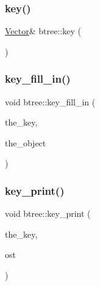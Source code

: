\mbox{\label{classbtree_abc561b2c60acc5a699637b7eb2549503}} 
\subsubsection{\texorpdfstring{key()}{key()}}
{\footnotesize\ttfamily \mbox{\hyperlink{class_vector}{Vector}}\& btree\+::key (\begin{DoxyParamCaption}{ }\end{DoxyParamCaption})\hspace{0.3cm}{\ttfamily [inline]}}

\mbox{\label{classbtree_ae75d5ef9677891b93960a55dffdc6eb2}} 
\subsubsection{\texorpdfstring{key\+\_\+fill\+\_\+in()}{key\_fill\_in()}}
{\footnotesize\ttfamily void btree\+::key\+\_\+fill\+\_\+in (\begin{DoxyParamCaption}\item[{\mbox{\hyperlink{galois_8h_ab6cc7b4aeb6ea31aba2b3fbfc83ff5e6}{B\+Y\+TE}} $\ast$}]{the\+\_\+key,  }\item[{\mbox{\hyperlink{class_vector}{Vector}} \&}]{the\+\_\+object }\end{DoxyParamCaption})}

\mbox{\label{classbtree_a4d527d5afa4891a2fa69fc1a07c48627}} 
\subsubsection{\texorpdfstring{key\+\_\+print()}{key\_print()}}
{\footnotesize\ttfamily void btree\+::key\+\_\+print (\begin{DoxyParamCaption}\item[{\mbox{\hyperlink{galois_8h_ab6cc7b4aeb6ea31aba2b3fbfc83ff5e6}{B\+Y\+TE}} $\ast$}]{the\+\_\+key,  }\item[{ostream \&}]{ost }\end{DoxyParamCaption})}

\mbox{\label{classbtree_ac75ef7763f81f808bdf266f12d1fa137}} 
